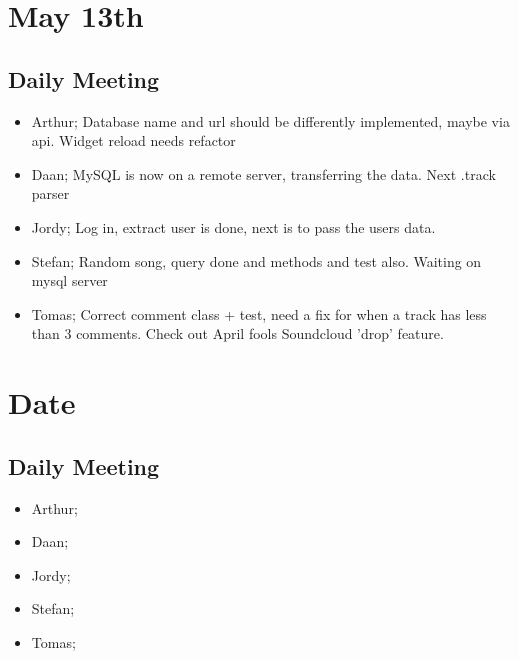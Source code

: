 \documentclass[]{article}
\begin{document}
\section*{May 13th}
\subsection*{Daily Meeting}
\begin{itemize}
	\item Arthur; Database name and url should be differently implemented, maybe via api. Widget reload needs refactor
	\item Daan; MySQL is now on a remote server, transferring the data. Next .track parser
	\item Jordy; Log in, extract user is done, next is to pass the users data.
	\item Stefan; Random song, query done and methods and test also. Waiting on mysql server
	\item Tomas; Correct comment class + test, need a fix for when a track has less than 3 comments. Check out April fools Soundcloud 'drop' feature.
\end{itemize}

\section*{Date}
\subsection*{Daily Meeting}
\begin{itemize}
	\item Arthur; 
	\item Daan; 
	\item Jordy; 
	\item Stefan; 
	\item Tomas; 
\end{itemize}
\end{document}

